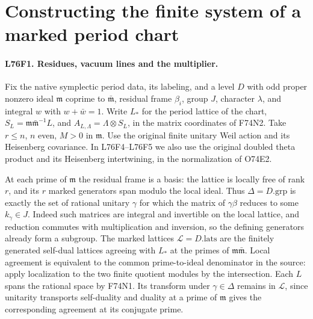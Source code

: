 \section{Constructing the finite system of a marked period chart}

\paragraph{L76F1. Residues, vacuum lines and the multiplier.}
Fix the native symplectic period data, its labeling, and a level
$D$ with odd proper nonzero ideal $\mathfrak m$ coprime to
$\bar{\mathfrak m}$, residual frame $\beta_i$, group $J$, character
$\lambda$, and integral $w$ with $w+\bar w=1$. Write $L_*$ for the
period lattice of the chart, $S_L=\mathfrak m\bar{\mathfrak m}^{-1}L$,
and $A_{L,\Lambda}=\Lambda\otimes S_L$, in the matrix coordinates
of F74N2. Take $r\le n$, $n$ even, $M>0$ in $\mathfrak m$.
Use the original finite unitary Weil action and its Heisenberg
covariance. In L76F4--L76F5 we also use the original doubled
theta product and its Heisenberg intertwining, in the normalization
of O74E2.

At each prime of $\mathfrak m$ the residual frame is a basis:
the lattice is locally free of rank $r$, and its $r$ marked
generators span modulo the local ideal. Thus
$\Delta=D.\mathrm{grp}$ is exactly the set of rational unitary
$\gamma$ for which the matrix of $\gamma\beta$ reduces to some
$k_\gamma\in J$. Indeed such matrices are integral and invertible
on the local lattice, and reduction commutes with multiplication
and inversion, so the defining generators already form a subgroup.
The marked lattices $\mathcal L=D.\mathrm{lats}$ are the finitely
generated self-dual lattices agreeing with $L_*$ at the primes of
$\mathfrak m\bar{\mathfrak m}$. Local agreement is equivalent to
the common prime-to-ideal denominator in the source: apply
localization to the two finite quotient modules by the intersection.
Each $L$ spans the rational space by F74N1. Its transform under
$\gamma\in\Delta$ remains in $\mathcal L$, since unitarity transports
self-duality and duality at a prime of $\mathfrak m$ gives the
corresponding agreement at its conjugate prime.

